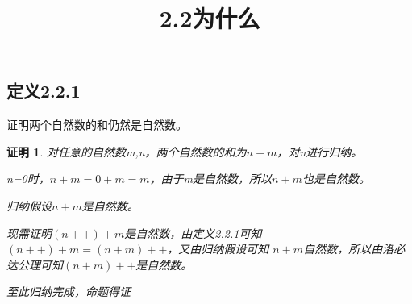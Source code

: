 \documentclass{article}
\theoremstyle{mystyle}
\theoremstyle{zproofstyle}
\newtheorem*{zproof}{证明}
\begin{document}
\title{2.2为什么}
\maketitle
\subsection*{定义2.2.1}
证明两个自然数的和仍然是自然数。

\begin{zproof}
    对任意的自然数m,n，两个自然数的和为$n+m$，对n进行归纳。

    n=0时，$n+m=0+m=m$，由于m是自然数，所以$n+m$也是自然数。

    归纳假设$n+m$是自然数。

    现需证明$(n++)+m$是自然数，由定义2.2.1可知$(n++)+m=(n+m)++$，又由归纳假设可知
    $n+m$自然数，所以由洛必达公理可知$(n+m)++$是自然数。

    至此归纳完成，命题得证
\end{zproof}
\end{document}
